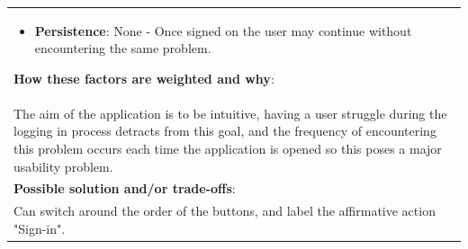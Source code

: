 \documentclass[pdftex,12pt,a4paper]{report}
\begin{document}
\begin{center}
\begin{tabular}{|p{\textwidth}|}
\begin{itemize}
	\item{\textbf{Persistence}:} None - Once signed on the user may continue without encountering the same problem.
	\end{itemize}
	\textbf{How these factors are weighted and why}:\\
	The aim of the application is to be intuitive, having a user struggle during the logging in process detracts from this goal, and the frequency of encountering this problem occurs each time the application is opened so this poses a major usability problem.\\
	\hline
	\textbf{Possible solution and/or trade-offs}:\\
Can switch around the order of the buttons, and label the affirmative action "Sign-in".\\
	\hline
	\end{tabular}
\end{center}
\end{document}
